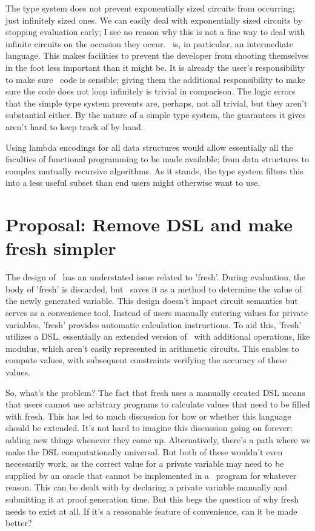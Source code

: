 \documentclass[
    9pt,            %
    techreport,        %
    affiltop,       %
]{art}
\begin{document}
The type system does not prevent exponentially sized circuits from occurring; just infinitely sized ones. We can easily deal with exponentially sized circuits by stopping evaluation early; I see no reason why this is not a fine way to deal with infinite circuits on the occasion they occur. \VampIR{}\ is, in particular, an intermediate language. This makes facilities to prevent the developer from shooting themselves in the foot less important than it might be. It is already the user's responsibility to make sure \VampIR{}\ code is sensible; giving them the additional responsibility to make sure the code does not loop infinitely is trivial in comparison. The logic errors that the simple type system prevents are, perhaps, not all trivial, but they aren't substantial either. By the nature of a simple type system, the guarantees it gives aren't hard to keep track of by hand.

Using lambda encodings for all data structures would allow essentially all the faculties of functional programming to be made available; from data structures to complex mutually recursive algorithms. As it stands, the type system filters this into a less useful subset than end users might otherwise want to use.

\section{Proposal: Remove DSL and make fresh simpler}

The design of \VampIR{}\ has an understated issue related to 'fresh'. During evaluation, the body of 'fresh' is discarded, but \VampIR{}\ saves it as a method to determine the value of the newly generated variable. This design doesn't impact circuit semantics but serves as a convenience tool. Instead of users manually entering values for private variables, 'fresh' provides automatic calculation instructions. To aid this, 'fresh' utilizes a DSL, essentially an extended version of \VampIR{}\ with additional operations, like modulus, which aren't easily represented in arithmetic circuits. This enables  to compute values, with subsequent constraints verifying the accuracy of these values.

So, what's the problem? The fact that fresh uses a manually created DSL means that users cannot use arbitrary programs to calculate values that need to be filled with fresh. This has led to much discussion for how or whether this language should be extended. It's not hard to imagine this discussion going on forever; adding new things whenever they come up. Alternatively, there's a path where we make the DSL computationally universal. But both of these wouldn't even necessarily work, as the correct value for a private variable may need to be supplied by an oracle that cannot be implemented in a \VampIR{}\ program for whatever reason. This can be dealt with by declaring a private variable manually and submitting it at proof generation time. But this begs the question of why fresh needs to exist at all. If it's a reasonable feature of convenience, can it be made better?
\end{document}
